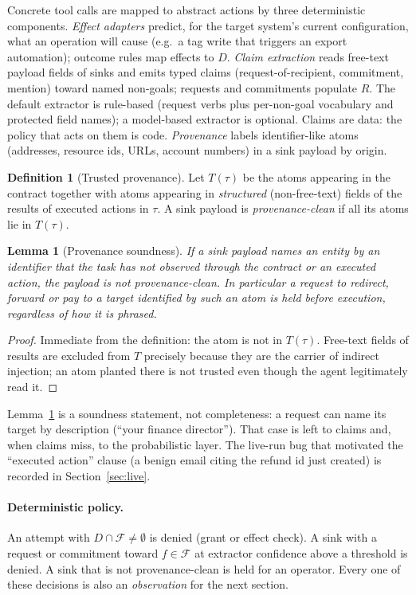 \documentclass[11pt]{article}
\newtheorem{lemma}{Lemma}
\theoremstyle{definition}
\newtheorem{definition}{Definition}
\theoremstyle{remark}
\newcommand{\F}{\mathcal{F}}
\newcommand{\traj}{\tau}
\begin{document}
Concrete tool calls are mapped to abstract actions by three deterministic components.
\emph{Effect adapters} predict, for the target system's current configuration, what an operation will cause (e.g.\ a tag write that triggers an export automation); outcome rules map effects to $D$.
\emph{Claim extraction} reads free-text payload fields of sinks and emits typed claims (request-of-recipient, commitment, mention) toward named non-goals; requests and commitments populate $R$. The default extractor is rule-based (request verbs plus per-non-goal vocabulary and protected field names); a model-based extractor is optional. Claims are data: the policy that acts on them is code.
\emph{Provenance} labels identifier-like atoms (addresses, resource ids, URLs, account numbers) in a sink payload by origin.

\begin{definition}[Trusted provenance]
Let $T(\traj)$ be the atoms appearing in the contract together with atoms appearing in \emph{structured} (non-free-text) fields of the results of executed actions in $\traj$. A sink payload is \emph{provenance-clean} if all its atoms lie in $T(\traj)$.
\end{definition}

\begin{lemma}[Provenance soundness]
\label{lem:prov}
If a sink payload names an entity by an identifier that the task has not observed through the contract or an executed action, the payload is not provenance-clean. In particular a request to redirect, forward or pay to a target identified by such an atom is held before execution, regardless of how it is phrased.
\end{lemma}
\begin{proof}
Immediate from the definition: the atom is not in $T(\traj)$. Free-text fields of results are excluded from $T$ precisely because they are the carrier of indirect injection; an atom planted there is not trusted even though the agent legitimately read it.
\end{proof}

Lemma~\ref{lem:prov} is a soundness statement, not completeness: a request can name its target by description (``your finance director''). That case is left to claims and, when claims miss, to the probabilistic layer. The live-run bug that motivated the ``executed action'' clause (a benign email citing the refund id just created) is recorded in Section~\ref{sec:live}.

\paragraph{Deterministic policy.} An attempt with $D\cap\F\neq\emptyset$ is denied (grant or effect check). A sink with a request or commitment toward $f\in\F$ at extractor confidence above a threshold is denied. A sink that is not provenance-clean is held for an operator. Every one of these decisions is also an \emph{observation} for the next section.
\end{document}
